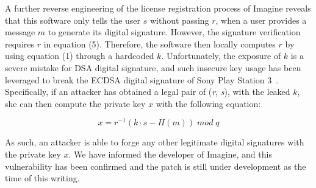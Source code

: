 A further reverse engineering of the license registration process of \textsf{\small Imagine} reveals that this software only tells the user $s$ without passing $r$, when a user provides a message $m$ to generate its digital signature. However, the signature verification requires $r$ in equation (5). Therefore, the software then locally computes $r$ by using equation (1) through a hardcoded $k$. 
Unfortunately, the exposure of $k$ is a severe mistake for \textsf{\small DSA} digital signature, and such insecure key usage has been leveraged to break the \textsf{\small ECDSA} digital signature of Sony Play Station 3~\cite{ecdsa2010ps3}. Specifically, if an attacker has obtained a legal pair of (\emph{r}, \emph{s}), with the leaked $k$, she can then compute the private key $x$ with the following equation:

\begin{equation}
x = r^{-1}(k \cdot s - H(m)) \; mod \; q
\end{equation}

\noindent As such, an attacker is able to forge any other legitimate digital signatures with the private key $x$. We have informed the developer of \textsf{\small Imagine}, and this vulnerability has been confirmed and the patch is still under development as the time of this writing.





